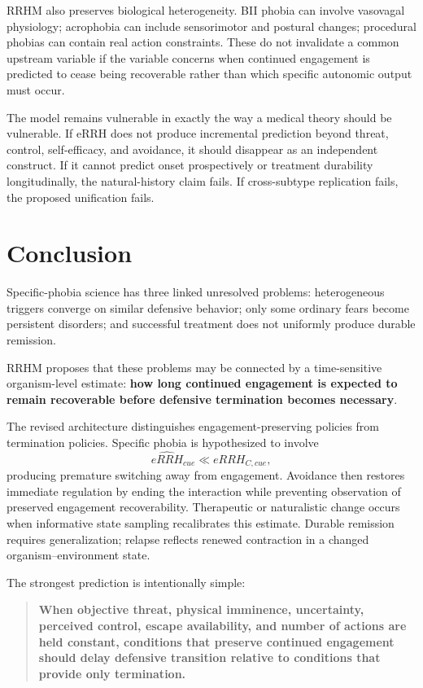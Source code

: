 \documentclass[11pt]{article}
\begin{document}
RRHM also preserves biological heterogeneity. BII phobia can involve vasovagal physiology; acrophobia can include sensorimotor and postural changes; procedural phobias can contain real action constraints. These do not invalidate a common upstream variable if the variable concerns when continued engagement is predicted to cease being recoverable rather than which specific autonomic output must occur.

The model remains vulnerable in exactly the way a medical theory should be vulnerable. If eRRH does not produce incremental prediction beyond threat, control, self-efficacy, and avoidance, it should disappear as an independent construct. If it cannot predict onset prospectively or treatment durability longitudinally, the natural-history claim fails. If cross-subtype replication fails, the proposed unification fails.

\section{Conclusion}

Specific-phobia science has three linked unresolved problems: heterogeneous triggers converge on similar defensive behavior; only some ordinary fears become persistent disorders; and successful treatment does not uniformly produce durable remission.

RRHM proposes that these problems may be connected by a time-sensitive organism-level estimate: \textbf{how long continued engagement is expected to remain recoverable before defensive termination becomes necessary}.

The revised architecture distinguishes engagement-preserving policies from termination policies. Specific phobia is hypothesized to involve
\[
\widehat{eRRH}_{cue}\ll eRRH_{C,cue},
\]
producing premature switching away from engagement. Avoidance then restores immediate regulation by ending the interaction while preventing observation of preserved engagement recoverability. Therapeutic or naturalistic change occurs when informative state sampling recalibrates this estimate. Durable remission requires generalization; relapse reflects renewed contraction in a changed organism--environment state.

The strongest prediction is intentionally simple:

\begin{quote}
\textbf{When objective threat, physical imminence, uncertainty, perceived control, escape availability, and number of actions are held constant, conditions that preserve continued engagement should delay defensive transition relative to conditions that provide only termination.}
\end{quote}
\end{document}
